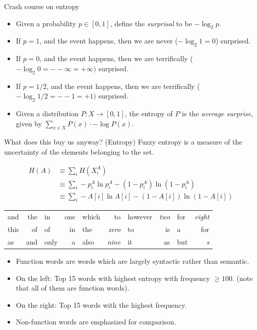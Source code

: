 \documentclass[8pt]{beamer}
\begin{document}
\begin{frame}{Crash course on entropy}
\begin{itemize}
\item Given a probability $p \in [0, 1]$, define the \emph{surprisal} to be $- \log_2 p$. \pause
\item  If $p = 1$, and the event happens, then we are never ($- \log_2 1 = 0$) surprised. \pause
\item  If $p = 0$, and the event happens, then we are terrifically ($- \log_2 0 = - -\infty = +\infty)$ surprised. \pause
\item  If $p = 1/2$, and the event happens, then we are terrifically ($- \log_2 1/2 = - -1 = +1)$ surprised. \pause
\item Given a distribution $P: X \to [0, 1]$, the entropy of $P$ is the \emph{average surprise}, given by $\sum_{x \in X} P(x) \cdot - \log P(x)$.  
\end{itemize}
\end{frame}

\begin{frame}{What does this buy us anyway? (Entropy)}
Fuzzy entropy is a measure of the uncertainty of the elements belonging to the set. \pause

\begin{align*} H(A) &\equiv \sum_i H(X^A_i) \\ &\equiv \sum_i
-p_i^A \ln p_i^A - (1 - p_i^A) \ln (1 - p_i^A) \\ &\equiv  \sum_i -A[i] \ln
A[i] - (1 - A[i]) \ln (1 - A[i])
\end{align*}


\begin{tabular}{l r | l r | l r | l r | l r}
and   & the   &   in    &   one         &   which     &   to          &   however &   \emph{two}  &   for     &   \emph{eight}  \\
this    & of    &   of      &   in          &   the       &   \emph{zero} &   to    &   is          &   a     &   for \\
as      & and   &   only  &   a           &   also      &   \emph{nine} &   it    &   as          &   but     &   \emph{s}
\end{tabular}

\begin{itemize}
\item Function words are words which are largely syntactic rather than semantic.
\item On the left: Top 15 words with highest entropy with frequency $\geq 100$. (note that all of them are function words).
\item On the right: Top 15 words with the highest frequency.
\item Non-function words are emphasized for comparison.
\end{itemize}
\end{frame}
\end{document}

